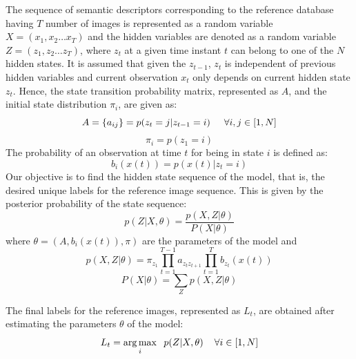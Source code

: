 \documentclass[letterpaper, 10 pt, conference]{ieeeconf}  %
\begin{document}
The sequence of semantic descriptors corresponding to the reference database having $T$ number of images is represented as a random variable $X=(x_1,x_2 \dots x_T)$ and the hidden variables are denoted as a random variable $Z=(z_1,z_2 \dots z_T)$, where $z_t$ at a given time instant $t$ can belong to one of the $N$ hidden states. It is assumed that given the $z_{t-1}$, $z_t$ is independent of previous hidden variables and current observation $x_t$ only depends on current hidden state $z_t$. Hence, the state transition probability matrix, represented as $A$, and the initial state distribution $\pi_i$, are given as:
\begin{equation}
 A = \{a_{ij}\} = p(z_t=j|z_{t-1}=i) \hspace{0.5cm} \forall i,j \in [1,N]
\end{equation}
\begin{equation}
 \pi_i = p(z_1=i)
\end{equation}
The probability of an observation at time $t$ for being in state $i$ is defined as:
\begin{equation}
 b_i(x(t)) = p(x(t)|z_t=i)
\end{equation}
Our objective is to find the hidden state sequence of the model, that is, the desired unique labels for the reference image sequence. This is given by the posterior probability of the state sequence:
\begin{equation}
 p(Z|X,\theta) = \frac { p(X,Z|\theta) } { P(X|\theta) }
\end{equation}
where $\theta=(A,b_i(x(t)),\pi)$ are the parameters of the model and 
\begin{equation}
p( X,Z | \theta ) = \pi_{z_1} \prod\limits_{t=1}^{T-1}a_{z_tz_{t+1}} \prod\limits_{t=1}^{T}b_{z_t}(x(t))
\end{equation}
\begin{equation}
P(X | \theta) = \sum\limits_Z p( X,Z | \theta )
\end{equation}

The final labels for the reference images, represented as $L_t$, are obtained after estimating the parameters $\theta$ of the model:
\begin{equation}
 L_t = \operatorname*{arg\,max}_i \hspace{0.2cm} p(Z|X,\theta) \hspace{0.4cm} \forall i \in [1,N]
\end{equation}
\end{document}
